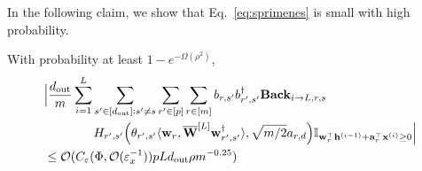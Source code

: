 		\iffalse
		In the following claim, we show that Eq.~\ref{eq:sprimenes} is small with high probability. 
		
		\begin{claim}
			With probability at least $1-e^{-\Omega(\rho^2)}$,
			\begin{align*}
				&\Big|\frac{d_{\mathrm{out}} }{m} \sum_{i=1}^{L}  \sum_{s' \in [d_{\mathrm{out}} ]: s' \ne s} \sum_{r' \in [p]} \sum_{r \in [m]}  b_{r, s'} b_{r', s'}^{\dagger} \mathbf{Back}_{i \to L, r, s} \\& \quad \quad \quad \quad H_{r', s'}\Big(\theta_{r', s'} \langle \mathbf{w}_{r}, \overline{\mathbf{W}}^{[L]} \mathbf{w}_{r', s'}^{\dagger}\rangle , \sqrt{m/2} a_{r, d}\Big) \mathbb{I}_{\mathbf{w}_r^{\top} \mathbf{h}^{(i-1)} + \mathbf{a}_r^{\top} \mathbf{x}^{(i)} \ge 0}\Big| \\&
				\le \mathcal{O}(C_\varepsilon(\Phi, \mathcal{O}( \varepsilon_x^{-1})) p L d_{\mathrm{out}} \rho m^{-0.25}) 
			\end{align*}
		\end{claim}
		
